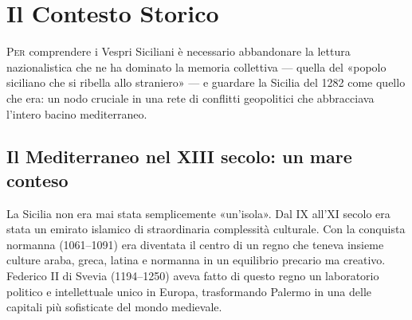 

\chapter{Il Contesto Storico}

\lettrine[lines=4]{P}{er} comprendere i Vespri Siciliani è necessario
abbandonare la lettura nazionalistica che ne ha dominato la memoria
collettiva — quella del «popolo siciliano che si ribella allo straniero» —
e guardare la Sicilia del 1282 come quello che era: un nodo cruciale in
una rete di conflitti geopolitici che abbracciava l'intero bacino
mediterraneo.


\section{Il Mediterraneo nel XIII secolo: un mare conteso}

La Sicilia non era mai stata semplicemente «un'isola». Dal IX all'XI
secolo era stata un emirato islamico di straordinaria complessità
culturale. Con la conquista normanna (1061–1091) era diventata il centro
di un regno che teneva insieme culture araba, greca, latina e normanna
in un equilibrio precario ma creativo. Federico II di Svevia (1194–1250)
aveva fatto di questo regno un laboratorio politico e intellettuale unico
in Europa, trasformando Palermo in una delle capitali più sofisticate del
mondo medievale.

